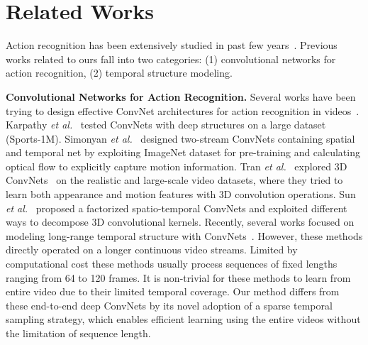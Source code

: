 \documentclass[runningheads]{llncs}
\begin{document}
\section{Related Works}
\label{sec:rw}
Action recognition has been extensively studied in past few years~\cite{WangS13a,gan2016you,PengWWQ14,gan2016recognizing,FernandoGMGT15}. 
Previous works related to ours fall into two categories: (1) convolutional networks for action recognition, (2) temporal structure modeling.

\textbf{Convolutional Networks for Action Recognition.} 
Several works have been trying to design effective ConvNet architectures for action recognition in videos~\cite{KarpathyTSLSF14,SimonyanZ14,TranBFTP15,JiXYY13,SunJYS15}. Karpathy \emph{et al.}~\cite{KarpathyTSLSF14} tested ConvNets with deep structures on a large dataset (Sports-1M). Simonyan \emph{et al.}~\cite{SimonyanZ14} designed two-stream ConvNets containing spatial and temporal net by exploiting ImageNet dataset for pre-training and calculating optical flow to explicitly capture motion information. Tran \emph{et al.}~\cite{TranBFTP15} explored 3D ConvNets~\cite{JiXYY13} on the realistic and large-scale video datasets, where they tried to learn both appearance and motion features with 3D convolution operations. Sun \emph{et al.}~\cite{SunJYS15} proposed a factorized spatio-temporal ConvNets and exploited different ways to decompose 3D convolutional kernels. Recently, several works focused on modeling long-range temporal structure with ConvNets~\cite{Ng15,varol,DonahueJ2015}. However, these methods directly operated on a longer continuous video streams. Limited by computational cost these methods usually process sequences of fixed lengths ranging from 64 to 120 frames. It is non-trivial for these methods to learn from entire video due to their limited temporal coverage. Our method differs from these end-to-end deep ConvNets by its novel adoption of a sparse temporal sampling strategy, which enables efficient learning using the entire videos without the limitation of sequence length.
\end{document}
